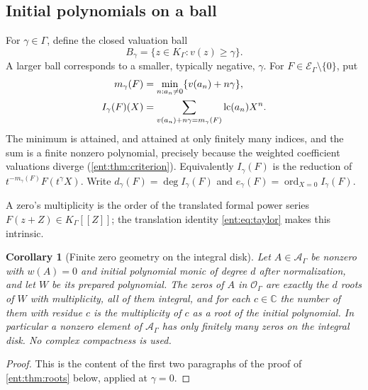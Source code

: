 \documentclass[11pt]{article}
\theoremstyle{plain}
\theoremstyle{plain}
\theoremstyle{plain}
\newtheorem{corollary}[corollary]{Corollary}
\theoremstyle{definition}
\theoremstyle{definition}
\theoremstyle{definition}
\theoremstyle{definition}
\theoremstyle{remark}
\newcommand{\C}{\mathbb C}\newcommand{\R}{\mathbb R}
\newcommand{\K}{K_\Gamma}\newcommand{\KD}{K_\Delta}
\newcommand{\E}{\mathcal E_\Gamma}
\newcommand{\A}{\mathcal A_\Gamma}\newcommand{\OO}{\mathcal O_\Gamma}
\DeclareMathOperator{\ord}{ord}\DeclareMathOperator{\cf}{cf}
\begin{document}
\subsection{Initial polynomials on a ball}
For $\gamma\in\Gamma$, define the closed valuation ball
\[
 B_\gamma=\{z\in\K:v(z)\ge\gamma\}.
\]
A larger ball corresponds to a smaller, typically negative, $\gamma$. For
$F\in\E\setminus\{0\}$, put
\begin{align}
 m_\gamma(F)&=\min_{n:a_n\ne0}\{v(a_n)+n\gamma\},\label{ent:eq:weighted}\\
 I_\gamma(F)(X)&=
 \sum_{v(a_n)+n\gamma=m_\gamma(F)}\operatorname{lc}(a_n)X^n.
 \label{ent:eq:initial}
\end{align}
The minimum is attained, and attained at only finitely many indices, and the
sum is a finite nonzero polynomial, precisely because the weighted
coefficient valuations diverge (\cref{ent:thm:criterion}). Equivalently
$I_\gamma(F)$ is the reduction of $t^{-m_\gamma(F)}F(t^\gamma X)$. Write
$d_\gamma(F)=\deg I_\gamma(F)$ and $e_\gamma(F)=\ord_{X=0}I_\gamma(F)$.

A zero's multiplicity is the order of the translated formal power series
$F(z+Z)\in\K[[Z]]$; the translation identity \eqref{ent:eq:taylor} makes this
intrinsic.

\begin{corollary}[Finite zero geometry on the integral disk]
\label{ent:cor:integral-zeros}
Let $A\in\A$ be nonzero with $w(A)=0$ and initial polynomial monic of degree
$d$ after normalization, and let $W$ be its prepared polynomial. The zeros of
$A$ in $\OO$ are exactly the $d$ roots of $W$ with multiplicity, all of them
integral, and for each $c\in\C$ the number of them with residue $c$ is the
multiplicity of $c$ as a root of the initial polynomial. In particular a
nonzero element of $\A$ has only finitely many zeros on the integral disk.
No complex compactness is used.
\end{corollary}
\begin{proof}
This is the content of the first two paragraphs of the proof of
\cref{ent:thm:roots} below, applied at $\gamma=0$.
\end{proof}
\end{document}
